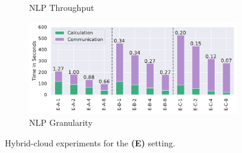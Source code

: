 \begin{figure}
\begin{subfigure}[c]{0.24\textwidth}
        \vspace{-15pt}
        \caption{NLP Throughput}
        \label{fig:nlp-private-hybrid-cloud-throughput}
    \end{subfigure}
    \begin{subfigure}[c]{0.21\textwidth}
        \includegraphics[width=\textwidth]{figures/misc/nlp-private-cloud-performance-granularity}  
        \caption{NLP Granularity} 
        \label{fig:nlp-private-hybrid-cloud-granularity}
    \end{subfigure}
    \vspace{-10pt}
    \caption{Hybrid-cloud experiments for the \textbf{(E)} setting.}
    \label{fig:private-hybrid-cloud-performance}
    \vspace*{-4mm}
\end{figure} 

\begin{table}[]
\begin{center}
\end{center}
\caption{Hybrid-cloud vs. cloud-only throughput for the \textbf{(E)} setting.}
\label{tab:hybrid-vs-cloud-only-startup}
\vspace*{-5mm}
\end{table}

